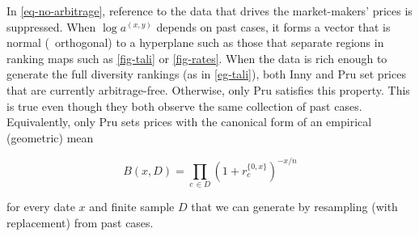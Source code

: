 \documentclass[12pt,a4paper,twoside]{article}
\newcommand{\xy}{{(x, y)}}
\begin{document}
\begin{example}
  In \cref{eq-no-arbitrage}, reference to the data that drives the
  market-makers' prices is suppressed. When $\log a^\xy$ depends on past cases,
  it forms a vector that is normal (\ie\ orthogonal) to a hyperplane such as
  those that separate regions in ranking maps such as \cref{fig-tali} or
  \cref{fig-rates}.  When the data is rich enough to generate the full
  diversity rankings (as in \cref{eg-tali}), both Inny and {Pru} set prices
  that are currently arbitrage-free.  Otherwise, only {Pru} satisfies this
  property. This is true even though they both observe the same collection of
  past cases.  Equivalently, only {Pru} sets prices with the
  canonical form of an empirical (geometric) mean
  \begin{linenomath*}
    \begin{equation} B(x, D) = \prod_{c\, \in
    D}\left( 1 + r^{\{0,x\}}_{c} \right)^{-{x}/{n}}
  \end{equation} \end{linenomath*} for every date $x$ and finite sample $D$
  that we can generate by resampling (with replacement) from past cases.

\end{example}
\end{document}
